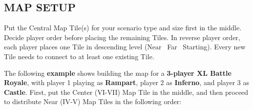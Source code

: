 \subsection*{\MakeUppercase{Map Setup}}


Put the Central Map Tile(s) for your scenario type and size first in the middle.
Decide player order before placing the remaining Tiles.
In reverse player order, each player places one Tile in descending level (Near \rightarrow\ Far \rightarrow\ Starting).  %
Every new Tile needs to connect to at least one existing Tile.

The following \textbf{example} shows building the map for a \textbf{3-player XL Battle Royale}, with player 1 playing as \textcolor{rampartbg}{\textbf{Rampart}}, player 2 as \textcolor{infernobg}{\textbf{Inferno}}, and player 3 as \textcolor{castlebg}{\textbf{Castle}}.
First, put the Center (VI-VII) Map Tile in the middle, and then proceed to distribute Near (IV-V) Map Tiles in the following order:

\bigskip

\newcommand{\playerimage}[2]{%
  \begin{minipage}[t]{0.28\textwidth} %
    \centering
    \texttt{[image: \#1]} %
    \captionof{figure}{\large\textbf{#2}}
  \end{minipage}%
}

\newcommand{\playerarrow}[4]{%
  \tikz[remember picture, overlay, baseline=(current bounding box.base)] {
    \coordinate (here) at (0,0);
    \draw[-Triangle, ultra thick, #4, opacity=0.8]
      ([shift={(#1,#2)}]here) -- ++({#3}:0.8cm);
  }%
}

